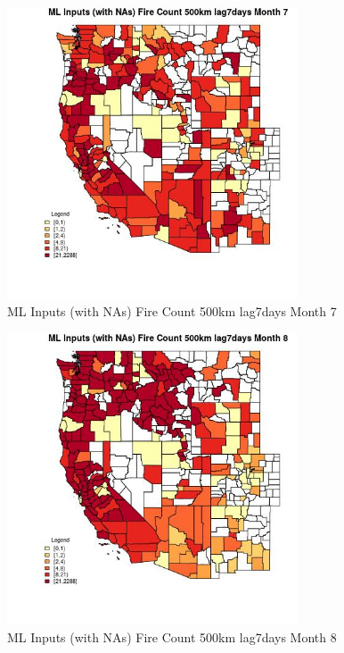 \begin{figure} 
\centering  
\includegraphics[width=0.77\textwidth]{Code_Outputs/Report_ML_input_PM25_Step4_part_e_de_duplicated_aves_compiled_2019-05-21wNAs_CountyFire_Count_500km_lag7daysmedianMonth7.jpg} 
\caption{\label{fig:Report_ML_input_PM25_Step4_part_e_de_duplicated_aves_compiled_2019-05-21wNAsCountyFire_Count_500km_lag7daysmedianMonth7}ML Inputs (with NAs) Fire Count 500km lag7days Month 7} 
\end{figure} 
 

\begin{figure} 
\centering  
\includegraphics[width=0.77\textwidth]{Code_Outputs/Report_ML_input_PM25_Step4_part_e_de_duplicated_aves_compiled_2019-05-21wNAs_CountyFire_Count_500km_lag7daysmedianMonth8.jpg} 
\caption{\label{fig:Report_ML_input_PM25_Step4_part_e_de_duplicated_aves_compiled_2019-05-21wNAsCountyFire_Count_500km_lag7daysmedianMonth8}ML Inputs (with NAs) Fire Count 500km lag7days Month 8} 
\end{figure} 
 


